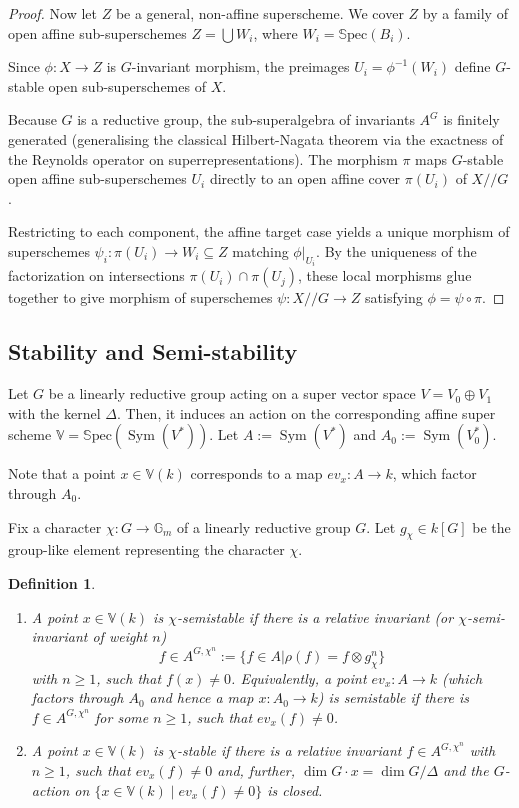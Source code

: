 \documentclass[12pt, reqno]{amsart}
\theoremstyle{plain}
\newtheorem{definition}[theorem]{Definition}
\numberwithin{equation}{section}
\def \ra{\rightarrow}
\newcommand{\Sym}{\operatorname{Sym}\nolimits}
\newcommand{\Spec}[1]{\mathbb{S}\mathrm{pec}(#1)}
\begin{document}
\begin{proof}
Now let $Z$ be a general, non-affine superscheme. We cover $Z$ by a family of open affine sub-superschemes $Z = \bigcup W_i$, where $W_i = \Spec{B_i}$. 

Since $\phi: X \to Z$ is $G$-invariant morphism, the preimages $U_i = \phi^{-1}(W_i)$ define $G$-stable open sub-superschemes of $X$. 


Because $G$ is a reductive group, the sub-superalgebra of invariants $A^{G}$ is finitely generated (generalising the classical Hilbert-Nagata theorem via the exactness of the Reynolds operator on superrepresentations). The morphism $\pi$ maps $G$-stable open affine sub-superschemes $U_i$ directly to an open affine cover $\pi(U_i)$ of $X / \! \! / G$. 

Restricting to each component, the affine target case yields a unique morphism of superschemes $\psi_i: \pi(U_i) \to W_i \subseteq Z$ matching $\phi|_{U_i}$. By the uniqueness of the factorization on intersections $\pi(U_i) \cap \pi(U_j)$, these local morphisms glue together to give morphism of superschemes $\psi: X / \! \! / G \to Z$ satisfying $\phi = \psi \circ \pi$.
\end{proof}
\subsection{Stability and Semi-stability}
Let $G$ be a linearly reductive group acting on a super vector space $V = V_0 \oplus V_1$ with the kernel $\Delta$. Then, it induces an
action on the corresponding affine super scheme 
$\mathbb V = \Spec{\Sym(V^*)}$. Let $A:= \Sym(V^*)$ and $A_0:= \Sym(V_0^*)$. 

Note that a point $x\in \mathbb{V}(k)$ corresponds to a map $ev_x : A\ra k$, which factor through $A_0$.

Fix a character $\chi: G \to \mathbb{G}_m$ of a linearly reductive group $G$. Let $g_\chi \in k[G]$ be the group-like element representing the character $\chi$.

\begin{definition}\label{def:stab}
\begin{enumerate}
    \item[(i)] A point $x \in \mathbb{V}(k)$ is $\chi$-semistable if there is a relative invariant (or $\chi$-semi-invariant of weight $n$) $$f \in A^{G,\chi^{n}} := \{ f \in A | \rho(f) = f \otimes g_\chi^{n} \}$$  with $n \ge 1$, such that $f(x) \ne 0$.
Equivalently, a point $ev_x: A \to k$ (which factors through $A_0$ and hence a map $x: A_0 \to k$) is semistable if there is $f \in A^{G,\chi^{n}}$ for some $n \geq 1$, such that $ev_x(f) \ne 0$.

    
    \item[(ii)] A point $x \in \mathbb{V}(k)$ is $\chi$-stable if there is a relative invariant $f \in A^{G,\chi^{n}}$ with $n \ge 1$, such that $ev_x(f) \ne 0$ and, further, $\dim G \cdot x = \dim G/\Delta$ and the $G$-action on $\{x \in \mathbb{V}(k) \mid ev_x(f) \ne 0\}$ is closed.
\end{enumerate}
\end{definition} 
\end{document}
